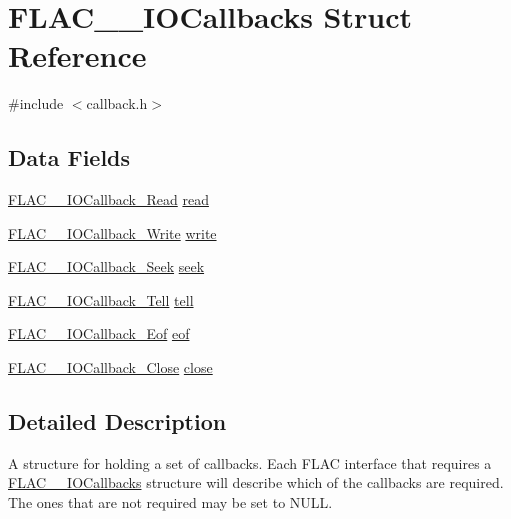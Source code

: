 \hypertarget{struct_f_l_a_c_____i_o_callbacks}{}\section{F\+L\+A\+C\+\_\+\+\_\+\+I\+O\+Callbacks Struct Reference}
\label{struct_f_l_a_c_____i_o_callbacks}


{\ttfamily \#include $<$callback.\+h$>$}

\subsection*{Data Fields}
\begin{DoxyCompactItemize}
\item 
\hyperlink{group__flac__callbacks_ga49d95218a6c09b215cd92cc96de71bf9}{F\+L\+A\+C\+\_\+\+\_\+\+I\+O\+Callback\+\_\+\+Read} \hyperlink{struct_f_l_a_c_____i_o_callbacks_a6dd767bc254e31dc47c9a0d218e72190}{read}
\item 
\hyperlink{group__flac__callbacks_gad991792235879aecae289b56a112e1b8}{F\+L\+A\+C\+\_\+\+\_\+\+I\+O\+Callback\+\_\+\+Write} \hyperlink{struct_f_l_a_c_____i_o_callbacks_ad64901e5a5710ee4c3c157c75d51ddc0}{write}
\item 
\hyperlink{group__flac__callbacks_gab3942bbbd6ae09bcefe7cb3a0060c49c}{F\+L\+A\+C\+\_\+\+\_\+\+I\+O\+Callback\+\_\+\+Seek} \hyperlink{struct_f_l_a_c_____i_o_callbacks_aa1a6f4623965a2d9fcc09b92fabaa1ee}{seek}
\item 
\hyperlink{group__flac__callbacks_ga45314930cabc2e9c04867eae6bca309f}{F\+L\+A\+C\+\_\+\+\_\+\+I\+O\+Callback\+\_\+\+Tell} \hyperlink{struct_f_l_a_c_____i_o_callbacks_a8ff0d175a7b3e9318270e305918df827}{tell}
\item 
\hyperlink{group__flac__callbacks_ga00ae3b3d373e691908e9539ebf720675}{F\+L\+A\+C\+\_\+\+\_\+\+I\+O\+Callback\+\_\+\+Eof} \hyperlink{struct_f_l_a_c_____i_o_callbacks_a4810838b77667dc02415c854b2103e66}{eof}
\item 
\hyperlink{group__flac__callbacks_ga0032267fac38220689778833e08f7387}{F\+L\+A\+C\+\_\+\+\_\+\+I\+O\+Callback\+\_\+\+Close} \hyperlink{struct_f_l_a_c_____i_o_callbacks_a8e447ae1999d9da9ebad5417f47223be}{close}
\end{DoxyCompactItemize}


\subsection{Detailed Description}
A structure for holding a set of callbacks. Each F\+L\+AC interface that requires a \hyperlink{struct_f_l_a_c_____i_o_callbacks}{F\+L\+A\+C\+\_\+\+\_\+\+I\+O\+Callbacks} structure will describe which of the callbacks are required. The ones that are not required may be set to N\+U\+LL.

